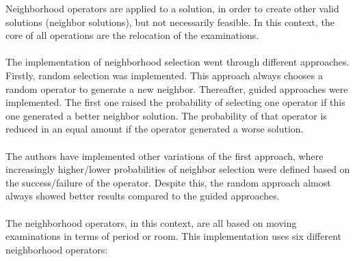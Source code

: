 Neighborhood operators are applied to a solution, in order to create other valid solutions (neighbor solutions), but not necessarily feasible. In this context, the core of all operations are the relocation of the examinations.\\
\\
The implementation of neighborhood selection went through different approaches. Firstly, random selection was implemented. This approach always chooses a random operator to generate a new neighbor. Thereafter, guided approaches were implemented. The first one raised the probability of selecting one operator if this one generated a better neighbor solution. The probability of that operator is reduced in an equal amount if the operator generated a worse solution.\\
\\
The authors have implemented other variations of the first approach, where increasingly higher/lower probabilities of neighbor selection were defined based on the success/failure of the operator. Despite this, the random approach almost always showed better results compared to the guided approaches.\\
\\
The neighborhood operators, in this context, are all based on moving examinations in terms of period or room. This implementation uses six different neighborhood operators:
\\
